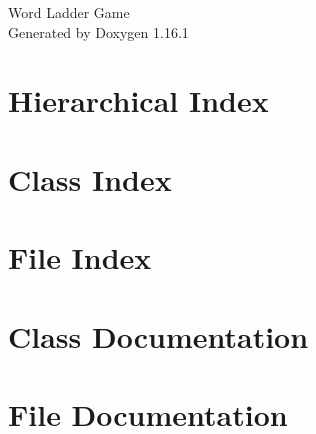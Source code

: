 \documentclass[twoside]{book}
\newcommand{\+}{\discretionary{\mbox{\scriptsize$\hookleftarrow$}}{}{}}
\newcommand{\clearemptydoublepage}{%
    \newpage{\pagestyle{empty}\cleardoublepage}%
  }
\begin{document}
  \raggedbottom
    \hypersetup{pageanchor=false,
                bookmarksnumbered=true,
                pdfencoding=unicode
               }
  \begin{titlepage}
  \vspace*{7cm}
  \begin{center}%
  {\Large Word Ladder Game}\\
  \vspace*{1cm}
  {\large Generated by Doxygen 1.16.1}\\
  \end{center}
  \end{titlepage}
  \clearemptydoublepage
  \tableofcontents
  \clearemptydoublepage
  \hypersetup{pageanchor=true}

\chapter{Hierarchical Index}

\chapter{Class Index}

\chapter{File Index}

\chapter{Class Documentation}



\chapter{File Documentation}





  \backmatter
  \newpage
  \clearemptydoublepage
  \printindex
\end{document}
